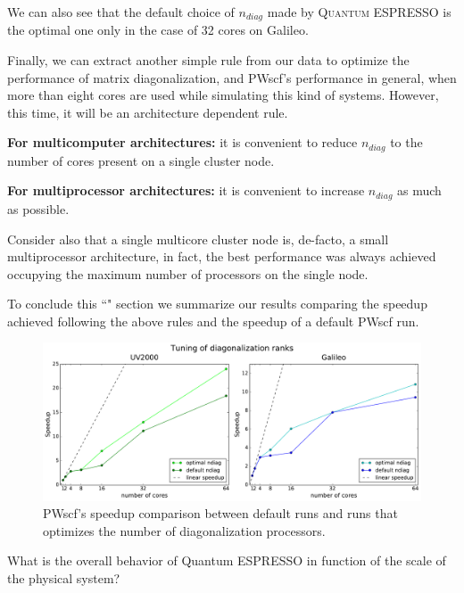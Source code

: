 \documentclass[a4paper,12pt]{article}
\newcommand\QE{\textsc{Quantum} ESPRESSO }
\begin{document}
We can also see that the default choice of $n_{diag}$ made by \QE is the optimal one only in the case of 32 cores on Galileo.

Finally, we can extract another simple rule from our data to optimize the performance of matrix diagonalization, and PWscf's performance in general, when more than eight cores are used while simulating this kind of systems.
However, this time, it will be an architecture dependent rule.

\textbf{For multicomputer architectures:} it is convenient to reduce $n_{diag}$ to the number of cores present on a single cluster node.

\textbf{For multiprocessor architectures:} it is convenient to increase $n_{diag}$ as much as possible.

Consider also that a single multicore cluster node is, de-facto, a small multiprocessor architecture, in fact, the best performance was always achieved occupying the maximum number of processors on the single node.

To conclude this ``\textit{}"  section we summarize our results comparing the speedup achieved following the above rules and the speedup of a default PWscf run.


\begin{figure}[hhh!]
\centerline{ \includegraphics[width=1.2\linewidth]{ndiag_speedup.pdf}	}
	\caption{PWscf's speedup comparison between default runs and runs that optimizes the number of diagonalization processors.}
	\label{fig:ndiagSpeedup}
\end{figure}


\newpage
\begin{center}
\begin{framed}
	What is the overall behavior of Quantum ESPRESSO in function of the scale of the physical system?
\end{framed}
\end{center}
\end{document}
